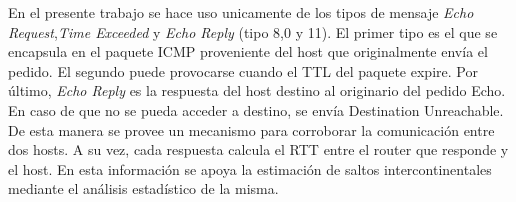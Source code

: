 En el presente trabajo se hace uso unicamente de los tipos de mensaje \textit{Echo Request},\textit{Time Exceeded} y \textit{Echo Reply} (tipo 8,0 y 11). El primer tipo es el que se encapsula en el paquete ICMP proveniente del host que originalmente envía el pedido. El segundo puede provocarse cuando el TTL del paquete expire. Por último, \textit{Echo Reply} es la respuesta del host destino al originario del pedido Echo. En caso de que no se pueda acceder a destino, se envía Destination Unreachable.\\
 De esta manera se provee un mecanismo para corroborar la comunicación entre dos hosts. A su vez, cada respuesta calcula el RTT entre el router que responde y el host. En esta información se apoya la estimación de saltos intercontinentales mediante el análisis estadístico de la misma.
